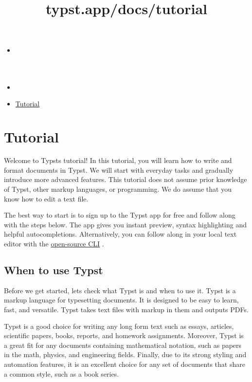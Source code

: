\title{typst.app/docs/tutorial}

\begin{itemize}
\tightlist
\item
  \href{/docs}{}
\item
  
\item
  \href{/docs/tutorial/}{Tutorial}
\end{itemize}

\section{Tutorial}\label{tutorial}

Welcome to Typst\textquotesingle s tutorial! In this tutorial, you will
learn how to write and format documents in Typst. We will start with
everyday tasks and gradually introduce more advanced features. This
tutorial does not assume prior knowledge of Typst, other markup
languages, or programming. We do assume that you know how to edit a text
file.

The best way to start is to sign up to the Typst app for free and follow
along with the steps below. The app gives you instant preview, syntax
highlighting and helpful autocompletions. Alternatively, you can follow
along in your local text editor with the
\href{https://github.com/typst/typst}{open-source CLI} .

\subsection{When to use Typst}\label{when-typst}

Before we get started, let\textquotesingle s check what Typst is and
when to use it. Typst is a markup language for typesetting documents. It
is designed to be easy to learn, fast, and versatile. Typst takes text
files with markup in them and outputs PDFs.

Typst is a good choice for writing any long form text such as essays,
articles, scientific papers, books, reports, and homework assignments.
Moreover, Typst is a great fit for any documents containing mathematical
notation, such as papers in the math, physics, and engineering fields.
Finally, due to its strong styling and automation features, it is an
excellent choice for any set of documents that share a common style,
such as a book series.

